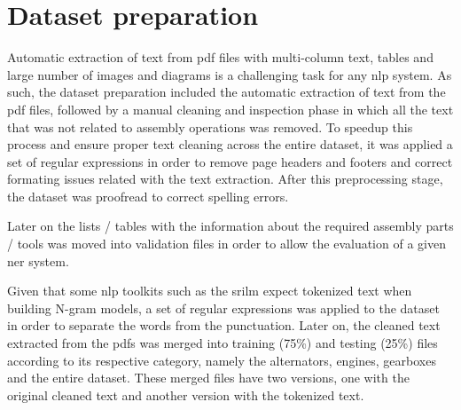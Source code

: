 \section{Dataset preparation}\label{sec:dataset-preparation}

Automatic extraction of text from \gls{pdf} files with multi-column text, tables and large number of images and diagrams is a challenging task for any \gls{nlp} system. As such, the dataset preparation included the automatic extraction of text from the \gls{pdf} files, followed by a manual cleaning and inspection phase in which all the text that was not related to assembly operations was removed. To speedup this process and ensure proper text cleaning across the entire dataset, it was applied a set of regular expressions in order to remove page headers and footers and correct formating issues related with the text extraction. After this preprocessing stage, the dataset was proofread to correct spelling errors.

Later on the lists / tables with the information about the required assembly parts / tools was moved into validation files in order to allow the evaluation of a given \gls{ner} system.

Given that some \gls{nlp} toolkits such as the \gls{srilm} \cite{Stolcke2002} expect tokenized text when building N-gram models, a set of regular expressions was applied to the dataset in order to separate the words from the punctuation. Later on, the cleaned text extracted from the \glspl{pdf} was merged into training (75\%) and testing (25\%) files according to its respective category, namely the alternators, engines, gearboxes and the entire dataset. These merged files have two versions, one with the original cleaned text and another version with the tokenized text.
